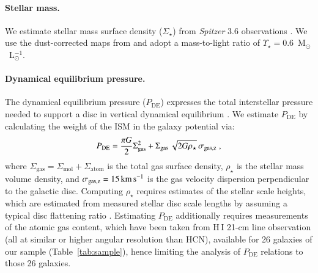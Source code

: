 \documentclass[letter, longauth]{aa} %
\newcommand*{\hone}{\ensuremath{\text{H}\,{\scriptstyle\text{I}}}\xspace}  %
\newcommand*{\sigmol}{\ensuremath{\Sigma_{\text{mol}}}\xspace}  %
\newcommand*{\pde}{\ensuremath{P_{\text{DE}}}\xspace}  %
\newcommand*{\sigstar}{\ensuremath{\Sigma_{\star}}\xspace}  %
\newcommand*{\rhostar}{\ensuremath{\rho_{\star}}\xspace}  %
\newcommand*{\sigatom}{\ensuremath{\Sigma_{\text{atom}}}\xspace}  %
\newcommand*{\siggas}{\ensuremath{\Sigma_{\text{gas}}}\xspace}  %
\begin{document}
\paragraph{Stellar mass.}
We estimate stellar mass surface density (\sigstar) from \textit{Spitzer} \SI{3.6}{\micron} observations \citep{Sheth2010,Querejeta2021b}. We use the dust-corrected maps from \citet{Querejeta2015} and adopt a mass-to-light ratio of $\Upsilon_\star = 0.6$~M$_\odot$~L$_\odot^{-1}$.

\paragraph{Dynamical equilibrium pressure.}
The dynamical equilibrium pressure (\pde) expresses the total interstellar pressure needed to support a disc in vertical dynamical equilibrium \citep[e.g., see][]{Ostriker2022, Schinnerer2024}. We estimate \pde by calculating the weight of the ISM in the galaxy potential via:
\begin{align}
    \pde = \dfrac{\pi G}{2}\siggas^2 + \siggas \, \sqrt{2G\rhostar} \, \sigma_{\rm gas, z} \;,
\end{align}
where $\siggas=\sigmol + \sigatom$ is the total gas surface density, $\rhostar$ is the stellar mass volume density, and $\sigma_{\rm gas, z}=\SI{15}{\km\per\s}$ \citep[e.g.][]{Sun2018} is the gas velocity dispersion perpendicular to the galactic disc.
Computing \rhostar requires estimates of the stellar scale heights, which are estimated from measured stellar disc scale lengths by assuming a typical disc flattening ratio \citep[see][for more details]{Sun2020b,Sun2022}.
Estimating \pde additionally requires measurements of the atomic gas content, which have been taken from \hone 21-cm line observation (all at similar or higher angular resolution than HCN), available for 26 galaxies of our sample (Table~\ref{tab:sample}), hence limiting the analysis of \pde relations to those 26 galaxies.
\end{document}
